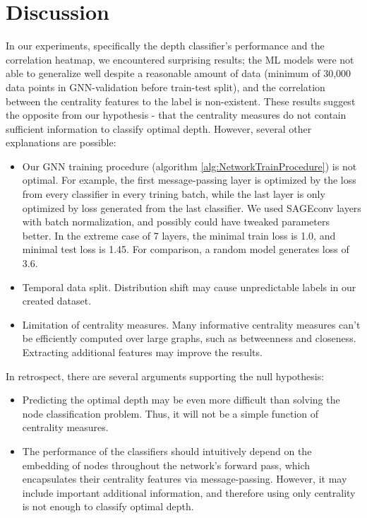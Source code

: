 \documentclass[11pt,a4paper]{article}
\begin{document}
\section{Discussion}
\label{sec:Discussion}
In our experiments, specifically the depth classifier's performance and the correlation heatmap, we encountered surprising results; the ML models were not able to generalize well despite a reasonable amount of data (minimum of 30,000 data points in GNN-validation before train-test split), and the correlation between the centrality features to the label is non-existent. These results suggest the opposite from our hypothesis - that the centrality measures do not contain sufficient information to classify optimal depth. However, several other explanations are possible:
\begin{itemize}
	\item Our GNN training procedure (algorithm \ref{alg:NetworkTrainProcedure}) is not optimal. For example, the first message-passing layer is optimized by the loss from every classifier in every trining batch, while the last layer is only optimized by loss generated from the last classifier. We used SAGEconv layers with batch normalization, and possibly could have tweaked parameters better. In the extreme case of 7 layers, the minimal train loss is 1.0, and minimal test loss is 1.45. For comparison, a random model generates loss of 3.6.
	\item Temporal data split. Distribution shift may cause unpredictable labels in our created dataset.
	\item Limitation of centrality measures. Many informative centrality measures can't be efficiently computed over large graphs, such as betweenness and closeness. Extracting additional features may improve the results.
\end{itemize}
In retrospect, there are several arguments supporting the null hypothesis:
\begin{itemize}
	\item Predicting the optimal depth may be even more difficult than solving the node classification problem. Thus, it will not be a simple function of centrality measures.
	\item The performance of the classifiers should intuitively depend on the embedding of nodes throughout the network's forward pass, which encapsulates their centrality features via message-passing. However, it may include important additional information, and therefore using only centrality is not enough to classify optimal depth.
\end{itemize}
\end{document}
